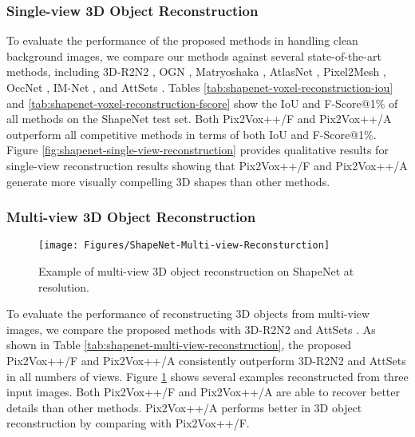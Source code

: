 \documentclass[twocolumn]{svjour3}
\begin{document}
\subsubsection{Single-view 3D Object Reconstruction}

To evaluate the performance of the proposed methods in handling clean background images, we compare our methods against several state-of-the-art methods, including 3D-R2N2 \citep{DBLP:conf/eccv/ChoyXGCS16}, OGN \citep{DBLP:conf/iccv/TatarchenkoDB17}, Matryoshaka \citep{DBLP:conf/cvpr/Richter018}, AtlasNet \citep{DBLP:conf/cvpr/GroueixFKRA18}, Pixel2Mesh \citep{DBLP:conf/eccv/WangZLFLJ18}, OccNet \citep{DBLP:conf/cvpr/MeschederONNG19}, IM-Net \citep{DBLP:conf/cvpr/ChenZ19}, and AttSets \citep{DBLP:journals/ijcv/YangSAN19}.
Tables \ref{tab:shapenet-voxel-reconstruction-iou} and \ref{tab:shapenet-voxel-reconstruction-fscore} show the IoU and F-Score@1\% of all methods on the ShapeNet test set.
Both Pix2Vox++/F and Pix2Vox++/A outperform all competitive methods in terms of both IoU and F-Score@1\%.
Figure \ref{fig:shapenet-single-view-reconstruction} provides qualitative results for single-view reconstruction results showing that Pix2Vox++/F and Pix2Vox++/A generate more visually compelling 3D shapes than other methods.

\subsubsection{Multi-view 3D Object Reconstruction}

\begin{figure}
  \centering
  \resizebox{\linewidth}{!} {
    \texttt{[image: Figures/ShapeNet-Multi-view-Reconsturction]}
  }
  \caption{Example of multi-view 3D object reconstruction on ShapeNet at  resolution.}
  \label{fig:shapenet-multi-view-reconstruction}
\end{figure}

To evaluate the performance of reconstructing 3D objects from multi-view images, we compare the proposed methods with 3D-R2N2 \citep{DBLP:conf/eccv/ChoyXGCS16} and AttSets \citep{DBLP:journals/ijcv/YangSAN19}.
As shown in Table \ref{tab:shapenet-multi-view-reconstruction}, the proposed Pix2Vox++/F and Pix2Vox++/A consistently outperform 3D-R2N2 and AttSets in all numbers of views.
Figure \ref{fig:shapenet-multi-view-reconstruction} shows several examples reconstructed from three input images.
Both Pix2Vox++/F and Pix2Vox++/A are able to recover better details than other methods.
Pix2Vox++/A performs better in 3D object reconstruction by comparing with Pix2Vox++/F. 
\end{document}
